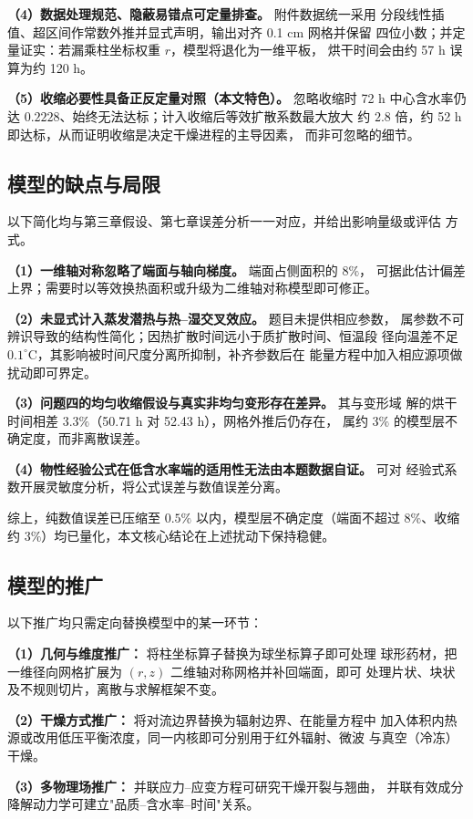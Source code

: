 \documentclass[12pt,a4paper]{article}
\begin{document}
\textbf{（4）数据处理规范、隐蔽易错点可定量排查。} 附件数据统一采用
分段线性插值、超区间作常数外推并显式声明，输出对齐 0.1 cm 网格并保留
四位小数；并定量证实：若漏乘柱坐标权重 $r$，模型将退化为一维平板，
烘干时间会由约 57 h 误算为约 120 h。

\textbf{（5）收缩必要性具备正反定量对照（本文特色）。} 忽略收缩时 72 h
中心含水率仍达 $0.2228$、始终无法达标；计入收缩后等效扩散系数最大放大
约 $2.8$ 倍，约 52 h 即达标，从而证明收缩是决定干燥进程的主导因素，
而非可忽略的细节。

\subsection{模型的缺点与局限}
以下简化均与第三章假设、第七章误差分析一一对应，并给出影响量级或评估
方式。

\textbf{（1）一维轴对称忽略了端面与轴向梯度。} 端面占侧面积的 $8\%$，
可据此估计偏差上界；需要时以等效换热面积或升级为二维轴对称模型即可修正。

\textbf{（2）未显式计入蒸发潜热与热--湿交叉效应。} 题目未提供相应参数，
属参数不可辨识导致的结构性简化；因热扩散时间远小于质扩散时间、恒温段
径向温差不足 $0.1^\circ$C，其影响被时间尺度分离所抑制，补齐参数后在
能量方程中加入相应源项做扰动即可界定。

\textbf{（3）问题四的均匀收缩假设与真实非均匀变形存在差异。} 其与变形域
解的烘干时间相差 $3.3\%$（50.71 h 对 52.43 h），网格外推后仍存在，
属约 $3\%$ 的模型层不确定度，而非离散误差。

\textbf{（4）物性经验公式在低含水率端的适用性无法由本题数据自证。} 可对
经验式系数开展灵敏度分析，将公式误差与数值误差分离。

综上，纯数值误差已压缩至 $0.5\%$ 以内，模型层不确定度（端面不超过
$8\%$、收缩约 $3\%$）均已量化，本文核心结论在上述扰动下保持稳健。

\subsection{模型的推广}
以下推广均只需定向替换模型中的某一环节：

\textbf{（1）几何与维度推广：} 将柱坐标算子替换为球坐标算子即可处理
球形药材，把一维径向网格扩展为 $(r,z)$ 二维轴对称网格并补回端面，即可
处理片状、块状及不规则切片，离散与求解框架不变。

\textbf{（2）干燥方式推广：} 将对流边界替换为辐射边界、在能量方程中
加入体积内热源或改用低压平衡浓度，同一内核即可分别用于红外辐射、微波
与真空（冷冻）干燥。

\textbf{（3）多物理场推广：} 并联应力--应变方程可研究干燥开裂与翘曲，
并联有效成分降解动力学可建立"品质--含水率--时间"关系。
\end{document}
